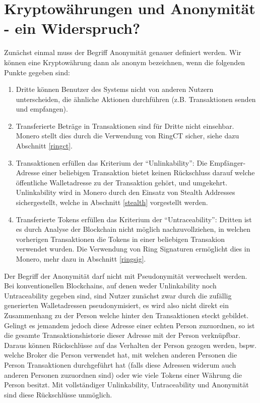 \chapter{Kryptowährungen und Anonymität - ein Widerspruch?} \label{anonymity}
Zunächst einmal muss der Begriff Anonymität genauer definiert werden. Wir können eine Kryptowährung dann als anonym bezeichnen,
wenn die folgenden Punkte gegeben sind: 
\begin{enumerate}
    \item Dritte können Benutzer des Systems nicht von anderen Nutzern unterscheiden, die ähnliche Aktionen durchführen (z.B. Transaktionen senden und empfangen)\cite{Bleumer2011b}.
    \item Transferierte Beträge in Transaktionen sind für Dritte nicht einsehbar. Monero stellt dies durch die Verwendung von RingCT sicher, siehe dazu Abschnitt \ref{ringct}.
    \item Transaktionen erfüllen das Kriterium der ``Unlinkability'': Die Empfänger-Adresse einer beliebigen Transaktion bietet keinen Rückschluss darauf welche öffentliche Walletadresse zu der Transaktion gehört, und umgekehrt\cite{Bleumer2011a}.
    Unlinkability wird in Monero durch den Einsatz von Stealth Addresses sichergestellt\cite{MP}, welche in Abschnitt \ref{stealth} vorgestellt werden.
    \item Transferierte Tokens erfüllen das Kriterium der ``Untraceability'': Dritten ist es durch Analyse der Blockchain nicht möglich nachzuvollziehen, in welchen vorherigen Transaktionen die Tokens in einer beliebigen Transakion verwendet wurden\cite{Bleumer2011}.
    Die Verwendung von Ring Signaturen ermöglicht dies in Monero, mehr dazu in Abschnitt \ref{ringsig}.
\end{enumerate} 

Der Begriff der Anonymität darf nicht mit Pseudonymität verwechselt werden. Bei konventionellen Blockchains, auf denen weder Unlinkability noch Untraceability gegeben sind, sind Nutzer zunächst zwar durch die zufällig generierten Walletadressen 
pseudonymisiert, es wird also nicht direkt ein Zusammenhang zu der Person welche hinter den Transaktionen steckt gebildet. Gelingt es jemandem jedoch diese Adresse einer echten Person zuzuordnen, so ist die gesamte Transaktionshistorie 
dieser Adresse mit der Person verknüpfbar. Daraus können Rückschlüsse auf das Verhalten der Person gezogen werden, bspw. welche Broker die Person verwendet hat, mit welchen anderen Personen die Person Transaktionen durchgeführt hat (falls diese Adressen widerum auch
anderen Personen zuzuordnen sind) oder wie viele Tokens einer Währung die Person besitzt. Mit vollständiger Unlinkability, Untraceability und Anonymität sind diese Rückschlüsse unmöglich.

